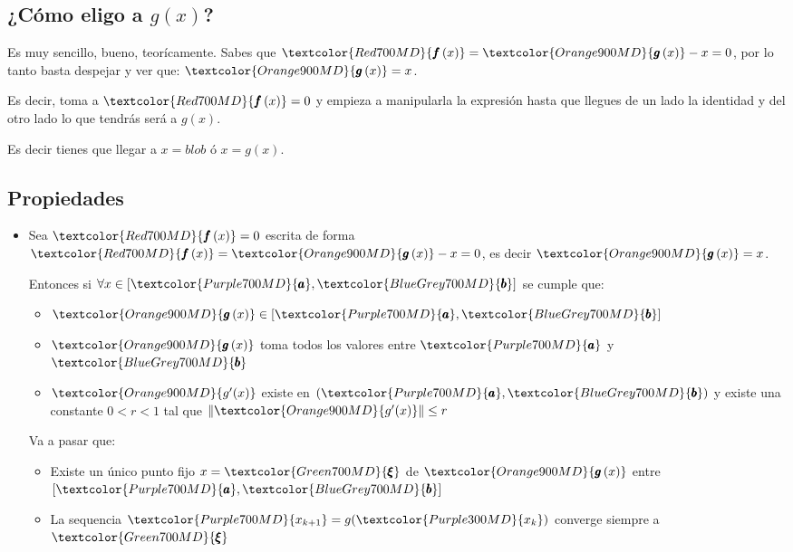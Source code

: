 \documentclass[12pt, fleqn]{report}                             %
\theoremstyle{break}                                            %
\newcommand{\Wrap}[1]           {\left( #1 \right)}             %
\newcommand{\Abs}[1]    {\left\lVert #1 \right\lVert}           %
\newcommand{\Color}[2]{\textcolor{#1}{#2}}                      %
\newcommand \ColorFun          {Red700MD}                       %
\newcommand \ColorFunG         {Orange900MD}                    %
\newcommand \ColorRoot         {Green700MD}                     %
\newcommand \ColorVarA         {Purple700MD}                    %
\newcommand \ColorVarB         {BlueGrey700MD}                  %
\newcommand \ColorVarX         {Purple300MD}                    %
\newcommand \ColorVarXpu       {Purple700MD}                    %
\newcommand \Fun[1]      {\Color{\ColorFun}{\pmb{f}\Wrap{#1}}}          %
\newcommand \FunG[1]     {\Color{\ColorFunG}{\pmb{g}\Wrap{#1}}}         %
\newcommand \Root        {\Color{\ColorRoot}{\pmb{\xi} }}               %
\newcommand \VarA        {\Color{\ColorVarA}{\pmb{a} }}                 %
\newcommand \VarB        {\Color{\ColorVarB}{\pmb{b} }}                 %
\newcommand \VarX        {\Color{\ColorVarX}{x_k }}                     %
\newcommand \VarXpu      {\Color{\ColorVarXpu}{x_{k+1}  }}              %
\begin{document}
        \clearpage
        \subsection{¿Cómo eligo a $g(x)$?}

            Es muy sencillo, bueno, teorícamente. Sabes que $\Fun{x} = \FunG{x} - x = 0$,
            por lo tanto basta despejar y ver que: $\FunG{x} = x$.
            
            Es decir, toma a $\Fun{x} = 0$ y empieza a manipularla la expresión hasta
            que llegues de un lado la identidad y del otro lado lo que tendrás será a $g(x)$.

            Es decir tienes que llegar a $x = blob$ ó $x = g(x)$.

            

        \subsection{Propiedades}

            \begin{itemize}
                \item Sea $\Fun{x} = 0$ escrita de forma $\Fun{x} = \FunG{x} - x = 0$, es decir
                    $\FunG{x} = x$.

                    Entonces si $\forall x \in [\VarA, \VarB]$ se cumple que:
                    \begin{itemize}
                        \item $\FunG{x} \in [\VarA, \VarB]$
                        \item $\FunG{x}$ toma todos los valores entre $\VarA$ y $\VarB$
                        \item $\Color{\ColorFunG}{g'(x)}$ existe en $(\VarA, \VarB)$ y existe una constante $0 < r < 1$ tal que
                            $\Abs{\Color{\ColorFunG}{g'(x)}} \leq r$
                    \end{itemize}

                    Va a pasar que: 
                    \begin{itemize}
                        \item Existe un único punto fijo $x = \Root$ de $\FunG{x}$ entre $[\VarA, \VarB]$
                        \item La sequencia $\VarXpu = g(\VarX)$ converge siempre a $\Root$
                    \end{itemize}

            \end{itemize}
\end{document}
